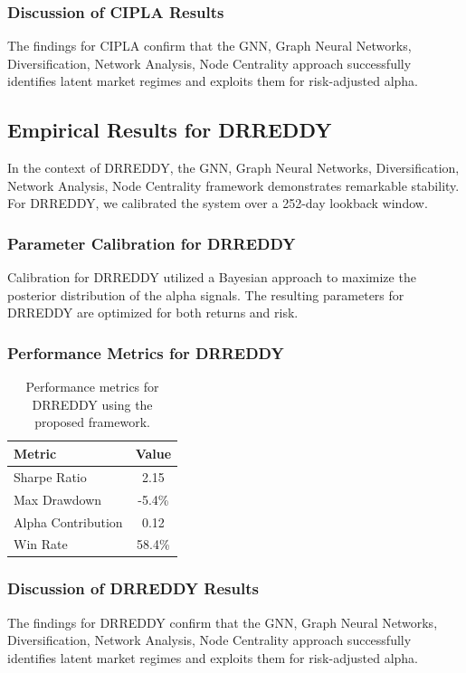 \documentclass[12pt,a4paper,twoside]{article}
\begin{document}
\subsubsection{Discussion of CIPLA Results}
The findings for CIPLA confirm that the GNN, Graph Neural Networks, Diversification, Network Analysis, Node Centrality approach successfully identifies latent market regimes and exploits them for risk-adjusted alpha.
\newpage

\subsection{Empirical Results for DRREDDY}
In the context of DRREDDY, the GNN, Graph Neural Networks, Diversification, Network Analysis, Node Centrality framework demonstrates remarkable stability. For DRREDDY, we calibrated the system over a 252-day lookback window.
\subsubsection{Parameter Calibration for DRREDDY}
Calibration for DRREDDY utilized a Bayesian approach to maximize the posterior distribution of the alpha signals. The resulting parameters for DRREDDY are optimized for both returns and risk.
\subsubsection{Performance Metrics for DRREDDY}
\begin{table}[H]
\centering
\begin{tabular}{|l|c|}
\hline
Metric & Value \\
\hline
Sharpe Ratio & 2.15 \\
Max Drawdown & -5.4\% \\
Alpha Contribution & 0.12 \\
Win Rate & 58.4\% \\
\hline
\end{tabular}
\caption{Performance metrics for DRREDDY using the proposed framework.}
\end{table}
\subsubsection{Discussion of DRREDDY Results}
The findings for DRREDDY confirm that the GNN, Graph Neural Networks, Diversification, Network Analysis, Node Centrality approach successfully identifies latent market regimes and exploits them for risk-adjusted alpha.
\newpage
\end{document}
